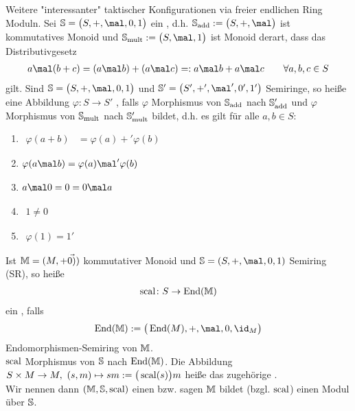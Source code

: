 \begin{beispiel}
	Weitere "interessanter" taktischer Konfigurationen via freier endlichen Ring Moduln.\nl
	Sei $\S=\big(S,+,\mal,0,1\big)$ ein , d.h. $\S_{\add}:=\big(S,+,\mal\big)$ ist kommutatives Monoid und $\S_{\mult}:=\big(S,\mal,1\big)$ ist Monoid derart, dass das Distributivgesetz
	\begin{align*}
		a\mal(b+c)=(a\mal b)+(a\mal c)=:a\mal b+a\mal c\qquad\forall a,b,c\in S
	\end{align*}
	gilt.
	Sind $\S=\big(S,+,\mal,0,1\big)$ und $\S'=\big(S',+',\mal',0',1'\big)$ Semiringe, so heiße eine Abbildung $\varphi\colon S\to S'$ , falls $\varphi$ Morphismus von $\S_{\add}$ nach $\S'_{\add}$ und $\varphi$ Morphismus von $\S_{\mult}$ nach $\S_{\mult}'$ bildet, d.h. es gilt für alle $a,b\in S$:
	\begin{enumerate}
		\item $\begin{aligned}
			\varphi(a+b)&=\varphi(a)+'\varphi(b)
		\end{aligned}$
		\item $\begin{aligned}
			\varphi(a\mal b)=\varphi(a)\mal'\varphi(b)
		\end{aligned}$
		\item $\begin{aligned}
			a\mal 0=0=0\mal a
		\end{aligned}$
		\item $\begin{aligned}
			1\neq 0
		\end{aligned}$
		\item $\begin{aligned}
			\varphi(1)=1'
		\end{aligned}$
	\end{enumerate}
	
	Ist $\M=(M,+\vec{0)})$ kommutativer Monoid und $\S=(S,+,\mal,0,1)$ Semiring (SR), so heiße 
	\begin{align*}
		\scal\colon S\to\End(\M)
	\end{align*}
	ein , falls
	\begin{align*}
		\End(\M):=\big(\End(M),+,\mal,0,\id_M\big)
	\end{align*}
	Endomorphismen-Semiring von $\M$.\\
	$\scal$ Morphismus von $\S$ nach $\End(\M)$.\nl
	Die Abbildung $S\times M\to M,~(s,m)\mapsto sm:=\big(\scal(s)\big)m$
	heiße das zugehörige .
	\\
	Wir nennen dann $(\M,\S,\scal)$ einen  bzw. sagen $\M$ bildet (bzgl. $\scal$) einen Modul über $\S$.
\end{beispiel}